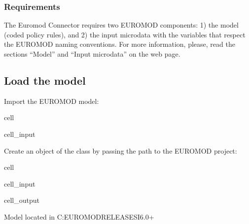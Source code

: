 \documentclass[letterpaper,10pt,english]{sphinxmanual}
\begin{document}
\subsubsection{Requirements}
\label{\detokenize{getstarted:requirements}}
\sphinxAtStartPar
The Euromod Connector requires two EUROMOD components: 1) the model (coded policy rules), and 2) the input microdata with the variables that respect the EUROMOD naming conventions.
For more information, please, read the sections “Model” and “Input microdata” on the  web page.


\subsection{Load the model}
\label{\detokenize{getstarted:load-the-model}}
\sphinxAtStartPar
Import the EUROMOD model:

\begin{sphinxuseclass}{cell}
\begin{sphinxuseclass}{cell_input}
\begin{sphinxVerbatim}[commandchars=\\\{\}]
   
\end{sphinxVerbatim}

\end{sphinxuseclass}
\end{sphinxuseclass}
\sphinxAtStartPar
Create an object of the  class by passing  the path to the  EUROMOD project:

\begin{sphinxuseclass}{cell}
\begin{sphinxuseclass}{cell_input}
\begin{sphinxVerbatim}[commandchars=\\\{\}]
\end{sphinxVerbatim}

\end{sphinxuseclass}
\begin{sphinxuseclass}{cell_output}
\begin{sphinxVerbatim}[commandchars=\\\{\}]
Model located in C:\PYGZbs{}EUROMOD\PYGZus{}RELEASES\PYGZus{}I6.0+
\end{sphinxVerbatim}

\end{sphinxuseclass}
\end{sphinxuseclass}
\end{document}
